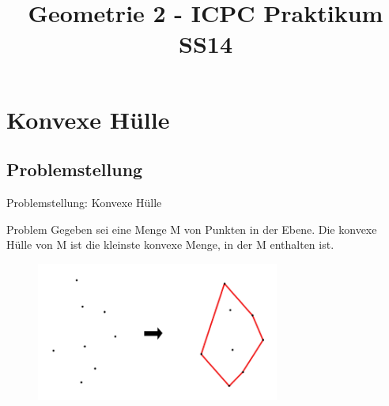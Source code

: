 \documentclass[18pt]{beamer}
\title[Geometrie 2]{Geometrie 2 - ICPC Praktikum SS14}
\institute{Tobias Hornberger $\cdot$ Paul Jungeblut $\cdot$ Enja Stein $\cdot$ Lena Winter}
\begin{document}

\begin{frame}
\titlepage
\end{frame}

\section{Konvexe Hülle}
	\subsection{Problemstellung}
		\begin{frame}{Problemstellung: Konvexe Hülle}
			\begin{block}{Problem}
			 Gegeben sei eine Menge M von Punkten in der Ebene. Die konvexe Hülle von M ist die kleinste konvexe Menge, in der M enthalten ist.
			\end{block}
			\begin{figure}
				\includegraphics[width=8cm]{logos/konhu.png}\\
			\end{figure}
		\end{frame}
		
\end{document}

